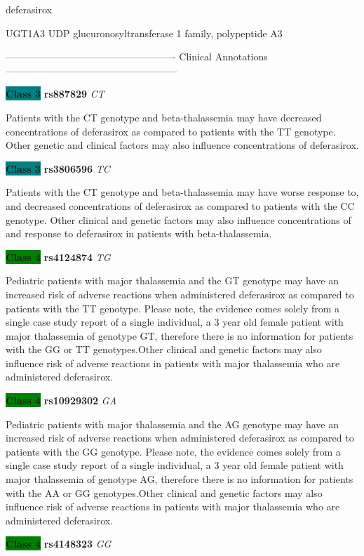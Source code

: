 \documentclass{resume} %
\begin{document}
\begin{rSection}{ deferasirox }
\begin{rSubsection}{ UGT1A3 }{ UDP glucuronosyltransferase 1 family, polypeptide A3 }{}{}
\item[] ---------------------------------------------------- Clinical Annotations -----------------------------------------------------\newline
\item \textbf{\colorbox{teal} {Class 3}} \textbf{ rs887829 } \textit{ CT }
\item[] Patients with the CT genotype and beta-thalassemia may have decreased concentrations of deferasirox as compared to patients with the TT genotype. Other genetic and clinical factors may also influence concentrations of deferasirox.\item \textbf{\colorbox{teal} {Class 3}} \textbf{ rs3806596 } \textit{ TC }
\item[] Patients with the CT genotype and beta-thalassemia may have worse response to, and decreased concentrations of deferasirox as compared to patients with the CC genotype. Other clinical and genetic factors may also influence concentrations of and response to deferasirox in patients with beta-thalassemia.\item \textbf{\colorbox{green} {Class 4}} \textbf{ rs4124874 } \textit{ TG }
\item[] Pediatric patients with major thalassemia and the GT genotype may have an increased risk of adverse reactions when administered deferasirox as compared to patients with the TT genotype. Please note, the evidence comes solely from a single case study report of a single individual, a 3 year old female patient with major thalassemia of genotype GT, therefore there is no information for patients with the GG or TT genotypes.Other clinical and genetic factors may also influence risk of adverse reactions in patients with major thalassemia who are administered deferasirox. \item \textbf{\colorbox{green} {Class 4}} \textbf{ rs10929302 } \textit{ GA }
\item[] Pediatric patients with major thalassemia and the AG genotype may have an increased risk of adverse reactions when administered deferasirox as compared to patients with the GG genotype. Please note, the evidence comes solely from a single case study report of a single individual, a 3 year old female patient with major thalassemia of genotype AG, therefore there is no information for patients with the AA or GG genotypes.Other clinical and genetic factors may also influence risk of adverse reactions in patients with major thalassemia who are administered deferasirox.\item \textbf{\colorbox{green} {Class 4}} \textbf{ rs4148323 } \textit{ GG }

\end{rSubsection}
\end{rSection}
\end{document}
